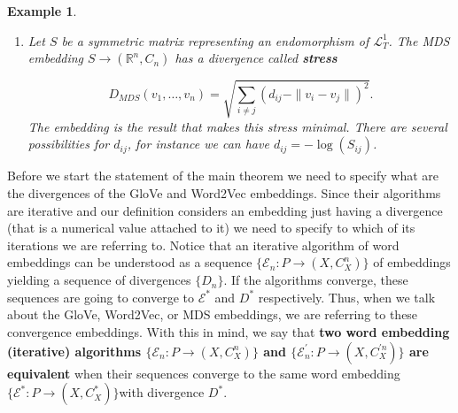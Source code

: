 \documentclass[10pt,a4paper]{elsarticle}
\renewcommand{\Bbb}{\mathbb}
\newcommand{\R}{\Bbb{R}}
\renewcommand{\L}{\mathcal{L}}
\newtheorem{exa}[theorem]{Example}
\begin{document}
\begin{exa}
\begin{enumerate}
		for $w\in \mathcal{L}_{T}^{1}$.
		
		
		
		The Skip-gram model is the dual of the CBOW embedding given by the matrix of equation \eqref{eq:fibers} (see also \cite[Section 2]{levy2014neural}). On the embedding space side of things we have that the divergence is computed using the softmax function $\sigma\colon \R^{V}\to [0,1]^{V}$:
		$$\sigma(x)=\left(\frac{\exp(v_{1})}{\sum_{i=1}^{n}\exp(v_{i})},\dots,\frac{\exp(v_{n})}{\sum_{i=1}^{n}\exp(v_{i})}\right)$$
		
		then, the divergence is the negative log-likelihood for a given target word $w_{t}$ and context word $w_c$
		
		\begin{equation}\label{eq:DivW2V}
			D_{W2V}(Q\to (\R^{n},C_{n}))=-\sum_{w_t, w_c}\log\left( \frac{\exp(v_t^{T}v_c)}{\sum_{i=1}^{V}\exp(v_{t}^{T}v_i)}\right)
		\end{equation}
		where $V=|\L_{T}^{1}|$.
		
		\item Let $S$ be a symmetric matrix representing an endomorphism of $\L_{T}^{1}$. The MDS embedding $S\to (\R^{n},C_{n})$ has a divergence called \textbf{stress}
		
		\begin{equation}\label{eq:DivMDS}
			D_{MDS}(v_1,\dots,v_n)=\sqrt{\sum_{i\neq j}(d_{ij}-\|v_i-v_j\|)^{2}}.
		\end{equation}
		The embedding is the result that makes this stress minimal.	There are several possibilities for $ d_{ij} $, for instance we can have  $d_{ij}=-\log (S_{ij})$.
	\end{enumerate}
\end{exa}

Before we start the statement of the main theorem we need to specify what are the divergences of the GloVe and Word2Vec embeddings. Since their algorithms are iterative and our definition considers an embedding just having a divergence (that is a numerical value attached to it) we need to specify to which of its iterations we are referring to. Notice that an iterative algorithm of word embeddings can be understood as a sequence $\{\mathcal{E}_{n}\colon P\to(X, C^{n}_{X})\}$ of embeddings yielding a sequence of divergences $\{D_{n}\}$. If the algorithms converge, these sequences are going to converge to $\mathcal{E}^{*}$ and $D^{*}$ respectively. Thus, when we talk about the GloVe, Word2Vec, or MDS embeddings, we are referring to these convergence embeddings. With this in mind, we say that \textbf{two word embedding (iterative) algorithms $\{\mathcal{E}_{n}\colon P\to(X,C^{n}_{X})\}$ and $\{\mathcal{E}_{n}^{\prime}\colon P\to(X,C^{\prime n}_{X})\}$ are equivalent} when their sequences converge to the same word embedding $\{\mathcal{E}^{*}\colon P\to(X,C^{*}_{X})\}$with divergence $D^{*}$.
\end{document}
